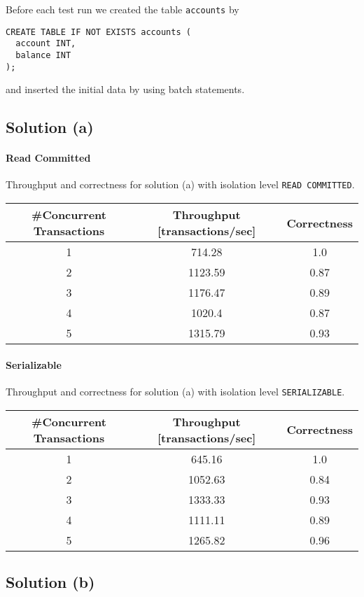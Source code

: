 \documentclass[11pt]{scrartcl}
\begin{document}
Before each test run we created the table \texttt{accounts} by
\begin{lstlisting}[style=dbtsql]
CREATE TABLE IF NOT EXISTS accounts (
  account INT,
  balance INT
);
\end{lstlisting}

and inserted the initial data by using batch statements.


\subsection*{Solution (a)}

\paragraph{Read Committed}

Throughput and correctness for solution (a) with isolation level \lstinline[style=dbtsql]{READ COMMITTED}.

\begin{table}[H]
  \centering
  \begin{tabular}{c|c|c}
    \#Concurrent Transactions & Throughput [transactions/sec] & Correctness
      \tabularnewline
    \hline
    1 & 714.28 & 1.0 \tabularnewline
    2 & 1123.59 & 0.87 \tabularnewline
    3 & 1176.47 & 0.89 \tabularnewline
    4 & 1020.4 & 0.87 \tabularnewline
    5 & 1315.79 & 0.93 \tabularnewline
  \end{tabular}
\end{table}

\paragraph{Serializable}

Throughput and correctness for solution (a) with isolation level \lstinline[style=dbtsql]{SERIALIZABLE}.

\begin{table}[H]
  \centering
  \begin{tabular}{c|c|c}
    \#Concurrent Transactions & Throughput [transactions/sec] & Correctness
      \tabularnewline
    \hline
    1 & 645.16 & 1.0 \tabularnewline
    2 & 1052.63 & 0.84 \tabularnewline
    3 & 1333.33 & 0.93 \tabularnewline
    4 & 1111.11 & 0.89 \tabularnewline
    5 & 1265.82 & 0.96 \tabularnewline
  \end{tabular}
\end{table}

\subsection*{Solution (b)}
\end{document}
